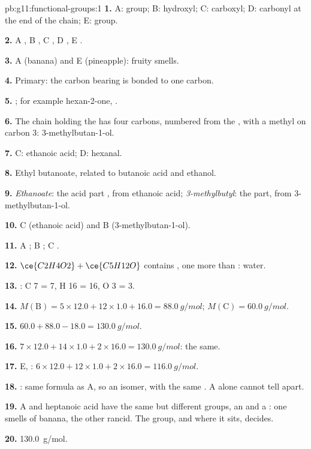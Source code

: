 \begin{solution}{pb:g11:functional-groups:1}
\textbf{1.} A:  group; B: hydroxyl; C: carboxyl; D: carbonyl at the
end of the chain; E:  group.

\textbf{2.} A , B , C , D , E .

\textbf{3.} A (banana) and E (pineapple): fruity smells.

\textbf{4.} Primary: the carbon bearing  is bonded to one carbon.

\textbf{5.} ; for example hexan-2-one,
.

\textbf{6.} The chain holding the  has four carbons, numbered
from the , with a methyl on carbon 3: 3-methylbutan-1-ol.

\textbf{7.} C: ethanoic acid; D: hexanal.

\textbf{8.} Ethyl butanoate, related to butanoic acid and ethanol.

\textbf{9.} \emph{Ethanoate}: the acid part , from ethanoic
acid; \emph{3-methylbutyl}: the  part, from 3-methylbutan-1-ol.

\textbf{10.} C (ethanoic acid) and B (3-methylbutan-1-ol).

\textbf{11.} A ; B ; C .

\textbf{12.} $\ce{C2H4O2} + \ce{C5H12O}$ contains , one
 more than : water.

\textbf{13.} : C 7 = 7, H 16 = 16,
O 3 = 3.

\textbf{14.} $M(\text{B}) = 5 \times 12.0 + 12 \times 1.0 + 16.0 =
\qty{88.0}{g/mol}$; $M(\text{C}) = \qty{60.0}{g/mol}$.

\textbf{15.} $60.0 + 88.0 - 18.0 = \qty{130.0}{g/mol}$.

\textbf{16.} $7 \times 12.0 + 14 \times 1.0 + 2 \times 16.0 =
\qty{130.0}{g/mol}$: the same.

\textbf{17.} E, : $6 \times 12.0 + 12 \times 1.0 + 2 \times
16.0 = \qty{116.0}{g/mol}$.

\textbf{18.} : same formula as A, so an isomer, with the
same . A  alone cannot tell  apart.

\textbf{19.} A and heptanoic acid have the same  but different
groups, an  and a : one smells of banana, the other
rancid. The group, and where it sits, decides.

\textbf{20.} \qty{130.0}{g/mol}.
\end{solution}
